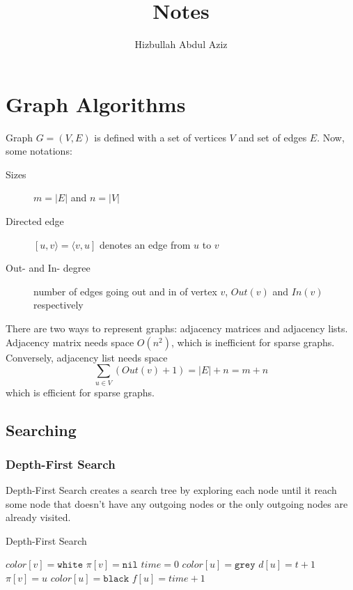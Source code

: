 \documentclass{article}
\author{Hizbullah Abdul Aziz}
\title{Notes}
\begin{document}
\maketitle

\section{Graph Algorithms}
Graph $G=(V,E)$ is defined with a set of vertices $V$ and set of edges $E$.
Now, some notations:
\begin{description}
  \item[Sizes] $m=|E|$ and $n=|V|$
  \item[Directed edge] $[u,v\rangle=\langle v,u]$ denotes an edge from $u$ to
    $v$
  \item[Out- and In- degree] number of edges going out and in of vertex $v$,
    $Out(v)$ and $In(v)$ respectively
\end{description}

There are two ways to represent graphs: adjacency matrices and adjacency lists.
Adjacency matrix needs space $O(n^2)$, which is inefficient for sparse graphs.
Conversely, adjacency list needs space $$\sum_{u\in V} (Out(v) + 1)=|E|+n=m+n$$
which is efficient for sparse graphs.


\subsection{Searching}
\subsubsection{Depth-First Search}
Depth-First Search creates a search tree by exploring each node until it reach
some node that doesn't have any outgoing nodes or the only outgoing nodes are
already visited.
\begin{algorithm}
  \caption{Depth-First Search}\label{graph:dfs}
  \begin{algorithmic}
      \State $color[v]=\texttt{white}$
      \State $\pi[v]=\texttt{nil}$
    \EndFor
    \State $time = 0$
        \State{}
      \EndIf
    \EndFor
    \EndFunction
    \State
      \State $color[u]=\texttt{grey}$
      \State $d[u]=t+1$
        \State{}
        \State $\pi[v]=u$
      \EndIf
      \State $color[u]=\texttt{black}$
      \State $f[u]=time+1$
      \EndFor
    \EndFunction
  \end{algorithmic}
\end{algorithm}
\end{document}

